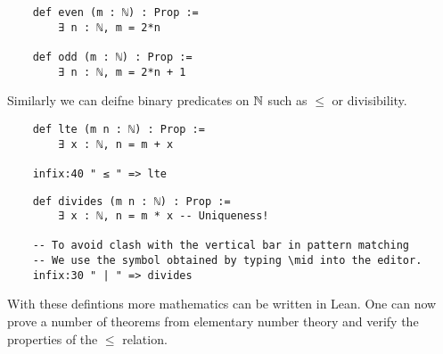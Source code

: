 \documentclass{book}
\begin{document}
\begin{lstlisting}
    def even (m : ℕ) : Prop :=
        ∃ n : ℕ, m = 2*n

    def odd (m : ℕ) : Prop :=
        ∃ n : ℕ, m = 2*n + 1
\end{lstlisting}

Similarly we can deifne binary predicates on $\mathbb{N}$ such as $\leq$ or divisibility. 

\begin{lstlisting}
    def lte (m n : ℕ) : Prop :=
        ∃ x : ℕ, n = m + x

    infix:40 " ≤ " => lte
\end{lstlisting}

\begin{lstlisting}
    def divides (m n : ℕ) : Prop :=
        ∃ x : ℕ, n = m * x -- Uniqueness!

    -- To avoid clash with the vertical bar in pattern matching
    -- We use the symbol obtained by typing \mid into the editor. 
    infix:30 " | " => divides
\end{lstlisting}

With these defintions more mathematics can be written in Lean. One can now prove a number of theorems from elementary  number theory and verify the properties of the $\leq$ relation. 


\newpage
\printbibliography
\end{document}
